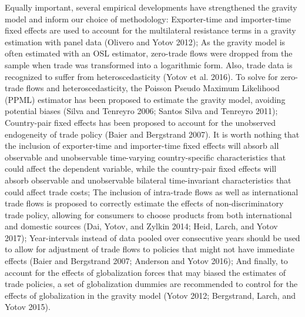 Equally important, several empirical developments have strengthened the
gravity model and inform our choice of methodology: Exporter-time and
importer-time fixed effects are used to account for the multilateral
resistance terms in a gravity estimation with panel data (Olivero and
Yotov 2012); As the gravity model is often estimated with an OSL
estimator, zero-trade flows were dropped from the sample when trade was
transformed into a logarithmic form. Also, trade data is recognized to
suffer from heteroscedasticity (Yotov et al. 2016). To solve for
zero-trade flows and heteroscedasticity, the Poisson Pseudo Maximum
Likelihood (PPML) estimator has been proposed to estimate the gravity
model, avoiding potential biases (Silva and Tenreyro 2006; Santos Silva
and Tenreyro 2011); Country-pair fixed effects has been proposed to
account for the unobserved endogeneity of trade policy (Baier and
Bergstrand 2007). It is worth nothing that the inclusion of
exporter-time and importer-time fixed effects will absorb all observable
and unobservable time-varying country-specific characteristics that
could affect the dependent variable, while the country-pair fixed
effects will absorb observable and unobservable bilateral time-invariant
characteristics that could affect trade costs; The inclusion of
intra-trade flows as well as international trade flows is proposed to
correctly estimate the effects of non-discriminatory trade policy,
allowing for consumers to choose products from both international and
domestic sources (Dai, Yotov, and Zylkin 2014; Heid, Larch, and Yotov
2017); Year-intervals instead of data pooled over consecutive years
should be used to allow for adjustment of trade flows to policies that
might not have immediate effects (Baier and Bergstrand 2007; Anderson
and Yotov 2016); And finally, to account for the effects of
globalization forces that may biased the estimates of trade policies, a
set of globalization dummies are recommended to control for the effects
of globalization in the gravity model (Yotov 2012; Bergstrand, Larch,
and Yotov 2015).